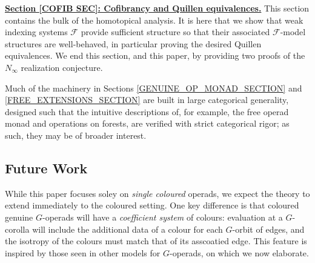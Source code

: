 \documentclass[a4paper,10pt]{article}%
\begin{document}
\textbf{\hyperref[COFIB SEC]{Section \ref{COFIB SEC}: Cofibrancy and Quillen equivalences.}} This section contains the bulk of the homotopical analysis. It is here that we show that weak indexing systems $\mathcal F$ provide sufficient structure so that their associated $\mathcal F$-model structures are well-behaved, in particular proving the desired Quillen equivalences. We end this section, and this paper, by providing two proofs of the $N_\infty$ realization conjecture.


Much of the machinery in Sections \ref{GENUINE_OP_MONAD_SECTION} and \ref{FREE_EXTENSIONS_SECTION} are built in large categorical generality, designed such that the intuitive descriptions of, for example, the free operad monad and operations on forests, are verified with strict categorical rigor; as such, they may be of broader interest.

\subsection{Future Work}


While this paper focuses soley on \textit{single coloured} operads, we expect the theory to extend immediately to the coloured setting. 
One key difference is that coloured genuine $G$-operads will have a \textit{coefficient system} of colours: evaluation at a $G$-corolla will include the additional data of a colour for each $G$-orbit of edges, and the isotropy of the colours must match that of its asscoatied edge.
This feature is inspired by those seen in other models for $G$-operads, on which we now elaborate. 
\end{document}
